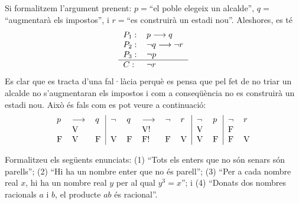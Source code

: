 \begin{solucio}
Si formalitzem l'argument prenent: $p=$\enquote{el poble elegeix un
alcalde}, $q=$\enquote{augmentarà els
impostos}, i $r=$\enquote{es construirà un
estadi nou}. Aleshores, es té%
\[%
\begin{tabular}
[c]{ll}%
$P_{1}:$ & $p\longrightarrow q$\\
$P_{2}:$ & $\lnot q\longrightarrow\lnot r$\\
$P_{3}:$ & $\lnot p$\\\hline
$C:$ & $\lnot r$%
\end{tabular}
\]
Es clar que es tracta d'una fal·làcia perquè es
pensa que pel fet de no triar un alcalde no s'augmentaran els impostos i com a
conseqüència no es construirà un estadi nou. Això és fals com
es pot veure a continuació:%
\[%
\begin{tabular}
[c]{lll|lllll|ll|ll}%
$p$ & $\longrightarrow$ & $q$ & $\lnot$ & $q$ & $\longrightarrow$ & $\lnot$ &
$r$ & $\lnot$ & $p$ & $\lnot$ & $r$\\
& V &  &  &  & V! &  &  & V &  & F & \\
F & V & F & V & F & F! & F & V & V & F & F & V
\end{tabular}
\]

\end{solucio}

\begin{exercici}
Formalitzeu els següents enunciats: (1) \enquote{Tots els enters
que no són senars són parells}; (2) \enquote{Hi ha un nombre enter que no és parell}; (3)
\enquote{Per a cada nombre real $x$, hi ha un nombre real $y$ per al
qual $y^{3}=x$}; i (4) \enquote{Donats dos nombres
racionals $a$ i $b$, el producte $ab$ és racional}.
\end{exercici}


